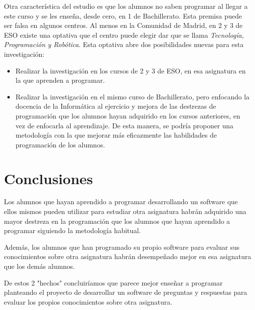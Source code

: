 \documentclass[palatino,miniheader]{apuntesURJC}
\begin{document}
Otra característica del estudio es que los alumnos no saben programar al llegar a este curso y se les enseña, desde cero, en 1 de Bachillerato.
%
Esta premisa puede ser falsa en algunos centros. 
%
Al menos en la Comunidad de Madrid, en 2 y 3 de ESO existe una optativa que el centro puede elegir dar que se llama \textit{Tecnología, Programación y Robótica}. 
%
Esta optativa abre dos posibilidades nuevas para esta investigación:
\begin{itemize}
 	\item Realizar la investigación en los cursos de 2 y 3 de ESO, en esa asignatura en la que aprenden a programar.
 	\item Realizar la investigación en el mismo curso de Bachillerato, pero enfocando la docencia de la Informática al ejercicio y mejora de las destrezas de programación que los alumnos hayan adquirido en los cursos anteriores, en vez de enfocarla al aprendizaje.
 	De esta manera, se podría proponer una metodología con la que mejorar más eficazmente las habilidades de programación de los alumnos.
 \end{itemize} 

\section{Conclusiones}

Los alumnos que hayan aprendido a programar desarrollando un software que ellos mismos pueden utilizar para estudiar otra asignatura habrán adquirido una mayor destreza en la programación que los alumnos que hayan aprendido a programar siguiendo la metodología habitual.

Además, los alumnos que han programado su propio software para evaluar sus conocimientos sobre otra asignatura habrán desempeñado mejor en esa asignatura que los demás alumnos.

De estos 2 "hechos" concluiríamos que parece mejor enseñar a programar planteando el proyecto de desarrollar un software de preguntas y respuestas para evaluar los propios conocimientos sobre otra asignatura.




\label{bibliografia}

\end{document}
